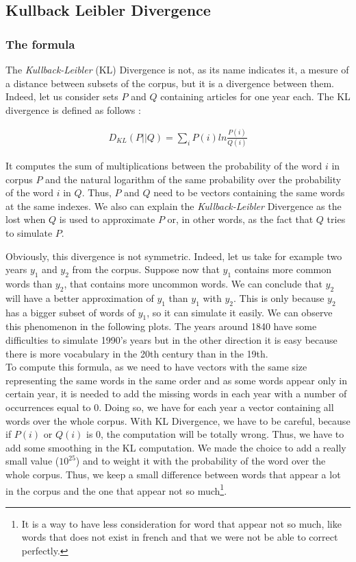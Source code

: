 \subsection{Kullback Leibler Divergence}

\subsubsection{The formula}
The \emph{Kullback-Leibler} (KL) Divergence is not, as its name indicates it, a mesure of a distance between subsets of the corpus, but it is a divergence between them. Indeed, let us consider sets $P$ and $Q$ containing articles for one year each. The KL divergence is defined as follows :

\begin{eqnarray}\label{KL}
    D_{KL}(P||Q) = \sum_i P(i) ln \frac{P(i)}{Q(i)}
\end{eqnarray}

It computes the sum of multiplications between the probability of the word $i$ in corpus $P$ and the natural logarithm of the same probability over the probability of the word $i$ in $Q$. Thus, $P$ and $Q$ need to be vectors containing the same words at the same indexes. We also can explain the \emph{Kullback-Leibler} Divergence as the lost when $Q$ is used to approximate $P$ or, in other words, as the fact that $Q$ tries to simulate $P$.

Obviously, this divergence is not symmetric. Indeed, let us take for example two years $y_1$ and $y_2$ from the corpus. Suppose now that $y_1$ contains more common words than $y_2$, that contains more uncommon words. We can conclude that $y_2$ will have a better approximation of $y_1$ than $y_1$ with $y_2$. This is only because $y_2$ has a bigger subset of words of $y_1$, so it can simulate it easily. We can observe this phenomenon in the following plots. The years around 1840 have some difficulties to simulate 1990's years but in the other direction it is easy because there is more vocabulary in the 20th century than in the 19th.\\

To compute this formula, as we need to have vectors with the same size representing the same words in the same order and as some words appear only in certain year, it is needed to add the missing words in each year with a number of occurrences equal to 0. Doing so, we have for each year a vector containing all words over the whole corpus. With KL Divergence, we have to be careful, because if $P(i)$ or $Q(i)$ is 0, the computation will be totally wrong. Thus, we have to add some smoothing in the KL computation. We made the choice to add a really small value ($10^{25}$) and to weight it with the probability of the word over the whole corpus. Thus, we keep a small difference between words that appear a lot in the corpus and the one that appear not so much\footnote{It is a way to have less consideration for word that appear not so much, like words that does not exist in french and that we were not be able to correct perfectly.}.

